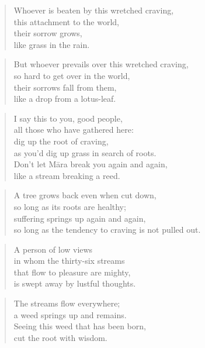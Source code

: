 \documentclass[12pt,openany]{book}%
\begin{document}
\begin{verse}%
Whoever is beaten by this wretched craving, \\
this attachment to the world, \\
their sorrow grows, \\
like grass in the rain. 

%
\end{verse}

\begin{verse}%
But whoever prevails over this wretched craving, \\
so hard to get over in the world, \\
their sorrows fall from them, \\
like a drop from a lotus-leaf. 

%
\end{verse}

\begin{verse}%
I say this to you, good people, \\
all those who have gathered here: \\
dig up the root of craving, \\
as you’d dig up grass in search of roots. \\
Don’t let \textsanskrit{Māra} break you again and again, \\
like a stream breaking a reed. 

%
\end{verse}

\begin{verse}%
A tree grows back even when cut down, \\
so long as its roots are healthy; \\
suffering springs up again and again, \\
so long as the tendency to craving is not pulled out. 

%
\end{verse}

\begin{verse}%
A person of low views \\
in whom the thirty-six streams \\
that flow to pleasure are mighty, \\
is swept away by lustful thoughts. 

%
\end{verse}

\begin{verse}%
The streams flow everywhere; \\
a weed springs up and remains. \\
Seeing this weed that has been born, \\
cut the root with wisdom. 

%
\end{verse}
\end{document}
